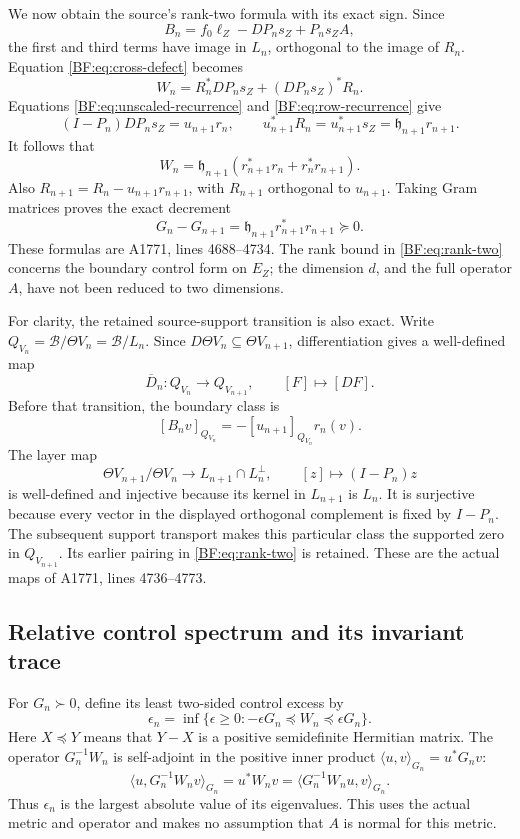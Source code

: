 We now obtain the source's rank-two formula with its exact sign.
Since
\[
B_n=f_0\ell_Z-DP_ns_Z+P_ns_ZA,
\]
the first and third terms have image in \(L_n\), orthogonal to
the image of \(R_n\).  Equation \eqref{BF:eq:cross-defect} becomes
\[
W_n=R_n^*DP_ns_Z+(DP_ns_Z)^*R_n.
\]
Equations \eqref{BF:eq:unscaled-recurrence} and
\eqref{BF:eq:row-recurrence} give
\[
(I-P_n)DP_ns_Z=u_{n+1}r_n,\qquad
u_{n+1}^*R_n=u_{n+1}^*s_Z
             =\mathfrak h_{n+1}r_{n+1}.
\]
It follows that
\begin{equation}
\boxed{\;
W_n=\mathfrak h_{n+1}
       \left(r_{n+1}^*r_n+r_n^*r_{n+1}\right).
\;}
\tag{BF.16}\label{BF:eq:rank-two}
\end{equation}
Also \(R_{n+1}=R_n-u_{n+1}r_{n+1}\), with \(R_{n+1}\)
orthogonal to \(u_{n+1}\).  Taking Gram matrices proves the exact
decrement
\begin{equation}
G_n-G_{n+1}
 =\mathfrak h_{n+1}r_{n+1}^*r_{n+1}\succeq0.
\tag{BF.17}\label{BF:eq:gram-decrement}
\end{equation}
These formulas are A1771, lines 4688--4734.  The rank bound in
\eqref{BF:eq:rank-two} concerns the boundary control form on \(E_Z\);
the dimension \(d\), and the full operator \(A\), have not been
reduced to two dimensions.

For clarity, the retained source-support transition is also exact.
Write \(Q_{V_n}=\mathcal B/\Theta V_n=\mathcal B/L_n\).
Since \(D\Theta V_n\subseteq\Theta V_{n+1}\), differentiation gives
a well-defined map
\[
\overline D_n:Q_{V_n}\longrightarrow Q_{V_{n+1}},
\qquad [F]\longmapsto[DF].
\]
Before that transition, the boundary class is
\[
[B_nv]_{Q_{V_n}}=-[u_{n+1}]_{Q_{V_n}}r_n(v).
\]
The layer map
\[
\Theta V_{n+1}/\Theta V_n
\longrightarrow L_{n+1}\cap L_n^\perp,\qquad
[z]\longmapsto(I-P_n)z
\]
is well-defined and injective because its kernel in \(L_{n+1}\)
is \(L_n\).  It is surjective because every vector in the displayed
orthogonal complement is fixed by \(I-P_n\).
The subsequent support transport makes this particular class the
supported zero in \(Q_{V_{n+1}}\).  Its earlier pairing in
\eqref{BF:eq:rank-two} is retained.  These are the actual maps of
A1771, lines 4736--4773.

\subsection{Relative control spectrum and its invariant trace}
\label{BF:trace}

For \(G_n\succ0\), define its least two-sided control excess by
\begin{equation}
\epsilon_n=\inf\{\epsilon\ge0:
               -\epsilon G_n\preceq W_n\preceq\epsilon G_n\}.
\tag{BF.18}\label{BF:eq:excess-definition}
\end{equation}
Here \(X\preceq Y\) means that \(Y-X\) is a positive semidefinite
Hermitian matrix.  The operator \(G_n^{-1}W_n\) is self-adjoint in
the positive inner product \(\langle u,v\rangle_{G_n}=u^*G_nv\):
\[
\langle u,G_n^{-1}W_nv\rangle_{G_n}=u^*W_nv
=\langle G_n^{-1}W_nu,v\rangle_{G_n}.
\]
Thus \(\epsilon_n\) is the largest absolute value of its eigenvalues.
This uses the actual metric and operator and makes no assumption that
\(A\) is normal for this metric.

